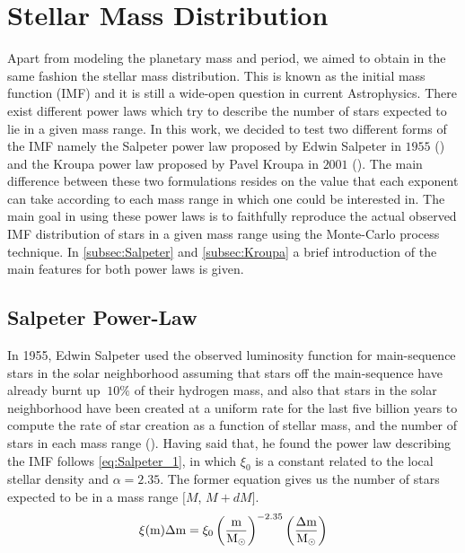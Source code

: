 \section{Stellar Mass Distribution}\label{sec:StellarMAS_IMF}

Apart from modeling the planetary mass and period, we aimed to obtain in the same fashion the stellar mass distribution. This is known as the initial mass function (IMF) and it is still a wide-open question in current Astrophysics. There exist different power laws which try to describe the number of stars expected to lie in a given mass range. In this work, we decided to test two different forms of the IMF namely the Salpeter power law proposed by Edwin Salpeter in $1955$  (\citeyear{1955ApJ...121..161S}) and the Kroupa power law proposed by Pavel Kroupa in $2001$  (\citeyear{2001MNRAS.322..231K}). The main difference between these two formulations resides on the value that each exponent can take according to each mass range in which one could be interested in. The main goal in using these power laws is to faithfully reproduce the actual observed IMF distribution of stars in a given mass range using the Monte-Carlo process technique. In \autoref{subsec:Salpeter} and \autoref{subsec:Kroupa} a brief introduction of the main features for both power laws is given.    

\subsection{Salpeter Power-Law} \label{subsec:Salpeter}

In 1955, Edwin Salpeter used the observed luminosity function for main-sequence stars in the solar neighborhood assuming that stars off the main-sequence have already burnt up $~10\%$ of their hydrogen mass, and also that stars in the solar neighborhood have been created at a uniform rate for the last five billion years to compute the rate of star creation as a function of stellar mass, and the number of stars in each mass range  (\citeyear{1955ApJ...121..161S}). Having said that, he found the power law describing the IMF follows \autoref{eq:Salpeter_1}, in which $\xi_0$ is a constant related to the local stellar density and $\alpha = 2.35$. The former equation gives us the number of stars expected to be in a mass range $[M$, $M + dM]$.\\ 

\begingroup
\Large
\begin{equation}
  \xi(\textnormal{m})\Delta \textnormal{m} = \xi_0 \left(\frac{\textnormal{m}}{\textnormal{M}_\odot} \right)^{-2.35} \left(\frac{\Delta \textnormal{m}}{\textnormal{M}_\odot} \right)
 \label{eq:Salpeter_1}
\end{equation}
\endgroup\\

